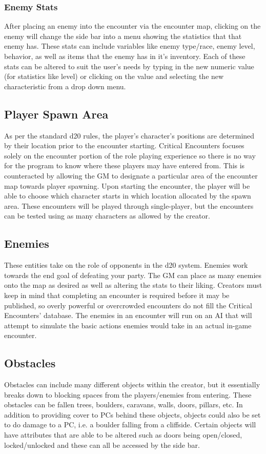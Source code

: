 \documentclass[12pt,a4paper]{report}
\begin{document}
			\subsubsection{Enemy Stats}
			After placing an enemy into the encounter via the encounter map, clicking on the enemy will change the side bar into a menu showing the statistics that that enemy has. These stats can include variables like enemy type/race, enemy level, behavior, as well as items that the enemy has in it's inventory. Each of these stats can be altered to suit the user's needs by typing in the new numeric value (for statistics like level) or clicking on the value and selecting the new characteristic from a drop down menu. 
		\subsection{Player Spawn Area}
		As per the standard d20 rules, the player's character's positions are determined by their location prior to the encounter starting. Critical Encounters focuses solely on the encounter portion of the role playing experience so there is no way for the program to know where these players may have entered from. This is counteracted by allowing the GM to designate a particular area of the encounter map towards player spawning. Upon starting the encounter, the player will be able to choose which character starts in which location allocated by the spawn area. These encounters will be played through single-player, but the encounters can be tested using as many characters as allowed by the creator.
		\subsection{Enemies}
		These entities take on the role of opponents in the d20 system. Enemies work towards the end goal of defeating your party. The GM can place as many enemies onto the map as desired as well as altering the stats to their liking. Creators must keep in mind that completing an encounter is required before it may be published, so overly powerful or overcrowded encounters do not fill the Critical Encounters' database. The enemies in an encounter will run on an AI that will attempt to simulate the basic actions enemies would take in an actual in-game encounter.
		\subsection{Obstacles}
		Obstacles can include many different objects within the creator, but it essentially breaks down to blocking spaces from the players/enemies from entering. These obstacles can be fallen trees, boulders, caravans, walls, doors, pillars, etc. In addition to providing cover to PCs behind these objects, objects could also be set to do damage to a PC, i.e. a boulder falling from a cliffside. Certain objects will have attributes that are able to be altered such as doors being open/closed, locked/unlocked and these can all be accessed by the side bar.
\end{document}
